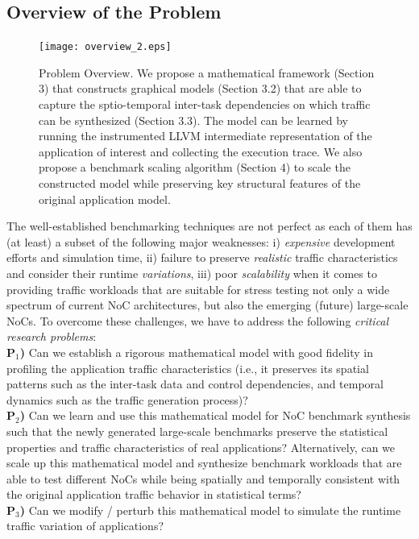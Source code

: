 \subsection{Overview of the Problem}
 \begin{figure}%
  \centering
  \texttt{[image: overview\_2.eps]}
  \vskip -2mm
  \caption{Problem Overview. We propose a mathematical framework (Section 3) that constructs graphical models (Section 3.2) that are able to capture the sptio-temporal inter-task dependencies on which traffic can be synthesized (Section 3.3). The model can be learned by running the instrumented LLVM intermediate representation of the application of interest and collecting the execution trace. We also propose a benchmark scaling algorithm (Section 4) to scale the constructed model while preserving key structural features of the original application model.}
  \label{fig:OVERVIEW}
  \vskip -3mm
\end{figure}
The well-established benchmarking techniques are not perfect as each of them has (at least) a subset of the following major weaknesses: i) \textit{expensive} development efforts and simulation time, ii) failure to preserve \textit{realistic} traffic characteristics and consider their runtime \textit{variations}, iii) poor \textit{scalability} when it comes to providing traffic workloads that are suitable for stress testing not only a wide spectrum of current NoC architectures, but also the emerging (future) large-scale NoCs. To overcome these challenges, we have to address the following \textit{critical research problems}: \\
\textbf{P$_1$)} Can we establish a rigorous mathematical model with good fidelity in profiling the application traffic characteristics (i.e., it preserves its spatial patterns such as the inter-task data and control dependencies, and temporal dynamics such as the traffic generation process)? \\
\textbf{P$_2$)} Can we learn and use this mathematical model for NoC benchmark synthesis such that the newly generated large-scale benchmarks preserve the statistical properties and traffic characteristics of real applications? Alternatively, can we scale up this mathematical model and synthesize benchmark workloads that are able to test different NoCs while being spatially and temporally consistent with the original application traffic behavior in statistical terms?\\
\textbf{P$_3$)} Can we modify / perturb this mathematical model to simulate the runtime traffic variation of applications?\\
